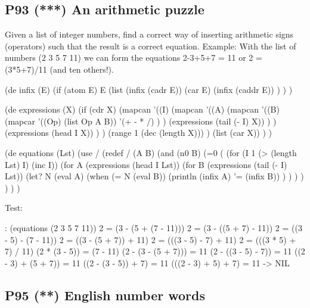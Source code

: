\pagebreak{}
\subsection*{{P93} (***) An arithmetic puzzle}
\label{sec:99-problems-P93}

Given a list of integer numbers, find a correct way of inserting
arithmetic signs (operators) such that the result is a correct equation.
Example: With the list of numbers (2 3 5 7 11) we can form the equations
2-3+5+7 = 11 or 2 = (3*5+7)/11 (and ten others!).

\begin{wideverbatim}

(de infix (E)
   (if (atom E)
      E
      (list
         (infix (cadr E))
         (car E)
         (infix (caddr E)) ) ) )

(de expressions (X)
   (if (cdr X)
      (mapcan
         '((I)
            (mapcan
               '((A)
                  (mapcan
                     '((B)
                        (mapcar
                           '((Op) (list Op A B))
                           '(+ - * /) ) )
                     (expressions (tail (- I) X)) ) )
               (expressions (head I X)) ) )
         (range 1 (dec (length X))) )
      (list (car X)) ) )

\end{wideverbatim}

\begin{wideverbatim}


(de equations (Lst)
   (use /
      (redef / (A B)
         (and (n0 B) (=0 (%
      (for (I 1  (> (length Lst) I)  (inc I))
         (for A (expressions (head I Lst))
            (for B (expressions (tail (- I) Lst))
               (let? N (eval A)
                  (when (= N (eval B))
                     (println (infix A) '= (infix B)) ) ) ) ) ) ) )

Test:

: (equations (2 3 5 7 11))
2 = (3 - (5 + (7 - 11)))
2 = (3 - ((5 + 7) - 11))
2 = ((3 - 5) - (7 - 11))
2 = ((3 - (5 + 7)) + 11)
2 = (((3 - 5) - 7) + 11)
2 = (((3 * 5) + 7) / 11)
(2 * (3 - 5)) = (7 - 11)
(2 - (3 - (5 + 7))) = 11
(2 - ((3 - 5) - 7)) = 11
((2 - 3) + (5 + 7)) = 11
((2 - (3 - 5)) + 7) = 11
(((2 - 3) + 5) + 7) = 11
-> NIL

\end{wideverbatim}

\pagebreak{}
\subsection*{{P95} (**) English number words}
\label{sec:99-problems-P95}

